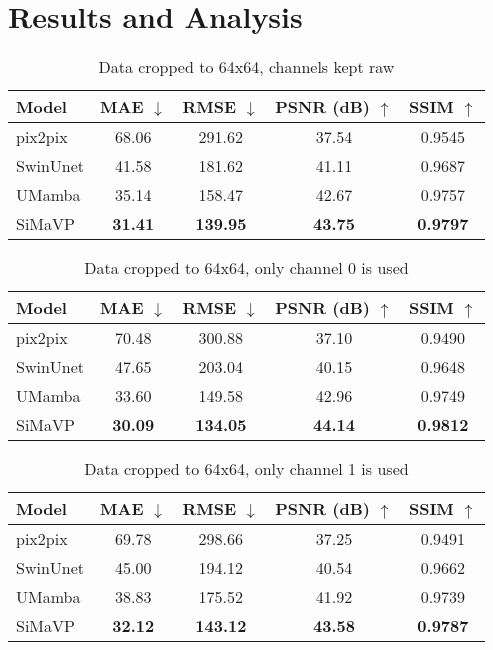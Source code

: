 \section{Results and Analysis}

\begin{table}[]
    \centering
    \caption{Data cropped to 64x64, channels kept raw}
    \label{tab:experiment_results}
    \begin{tabular}{lcccc}
    \hline
    \textbf{Model} & \textbf{MAE} $\downarrow$ & \textbf{RMSE} $\downarrow$ & \textbf{PSNR (dB)} $\uparrow$ & \textbf{SSIM} $\uparrow$ \\
    \hline
    pix2pix  & 68.06 & 291.62 & 37.54 & 0.9545 \\
    SwinUnet & 41.58 & 181.62 & 41.11 & 0.9687 \\
    UMamba   & 35.14 & 158.47 & 42.67 & 0.9757 \\
    SiMaVP   & \textbf{31.41} & \textbf{139.95} & \textbf{43.75} & \textbf{0.9797} \\
    \hline
    \end{tabular}
\end{table}

\begin{table}[]
    \centering
    \caption{Data cropped to 64x64, only channel 0 is used}
    \label{tab:experiment_results_ch0}
    \begin{tabular}{lcccc}
    \hline
    \textbf{Model} & \textbf{MAE} $\downarrow$ & \textbf{RMSE} $\downarrow$ & \textbf{PSNR (dB)} $\uparrow$ & \textbf{SSIM} $\uparrow$ \\
    \hline
    pix2pix  & 70.48 & 300.88 & 37.10 & 0.9490 \\
    SwinUnet & 47.65 & 203.04 & 40.15 & 0.9648 \\
    UMamba   & 33.60 & 149.58 & 42.96 & 0.9749 \\
    SiMaVP   & \textbf{30.09} & \textbf{134.05} & \textbf{44.14} & \textbf{0.9812} \\
    \hline
    \end{tabular}
\end{table}

\begin{table}[]
    \centering
    \caption{Data cropped to 64x64, only channel 1 is used}
    \label{tab:experiment_results_ch1}
    \begin{tabular}{lcccc}
    \hline
    \textbf{Model} & \textbf{MAE} $\downarrow$ & \textbf{RMSE} $\downarrow$ & \textbf{PSNR (dB)} $\uparrow$ & \textbf{SSIM} $\uparrow$ \\
    \hline
    pix2pix  & 69.78 & 298.66 & 37.25 & 0.9491 \\
    SwinUnet & 45.00 & 194.12 & 40.54 & 0.9662 \\
    UMamba   & 38.83 & 175.52 & 41.92 & 0.9739 \\
    SiMaVP   & \textbf{32.12} & \textbf{143.12} & \textbf{43.58} & \textbf{0.9787} \\
    \hline
    \end{tabular}
\end{table}
    